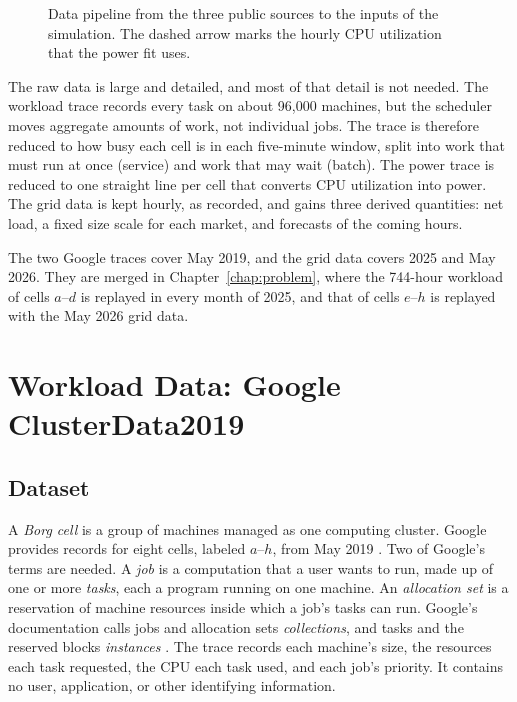 \documentclass{UNCC-thesis}
\begin{document}
\begin{figure}[tbp]
  \caption[Data pipeline from the three public sources]{Data pipeline from the three public sources to the inputs of the
  simulation. The dashed arrow marks the hourly CPU utilization that the power
  fit uses.}
  \label{fig:data-pipeline}
\end{figure}

The raw data is large and detailed, and most of that detail is not needed.
The workload trace records every task on about 96,000 machines, but the
scheduler moves aggregate amounts of work, not individual jobs. The trace is
therefore reduced to how busy each cell is in each five-minute window, split
into work that must run at once (service) and work that may wait (batch).
The power trace is reduced to one straight line per cell that converts CPU
utilization into power. The grid data is kept hourly, as recorded, and gains
three derived quantities: net load, a fixed size scale for each market, and
forecasts of the coming hours.

The two Google traces cover May 2019, and the grid data covers 2025 and May
2026. They are merged in Chapter~\ref{chap:problem}, where the
744-hour workload of cells \(a\)--\(d\) is replayed in every month of 2025,
and that of cells \(e\)--\(h\) is replayed with the May 2026 grid data.

\section{Workload Data: Google ClusterData2019}
\label{sec:clusterdata2019}

\subsection{Dataset}
\label{subsec:clusterdata-role}

A \emph{Borg cell} is a group of machines managed as one computing cluster.
Google provides records for eight cells, labeled \(a\)--\(h\), from May 2019
\cite{wilkes2020clusterdata2019, tirmazi2020borg}. Two of Google's terms are
needed. A \emph{job} is a computation that a user wants to run, made up of one
or more \emph{tasks}, each a program running on one machine. An
\emph{allocation set} is a reservation of machine resources inside which a
job's tasks can run. Google's documentation calls jobs and allocation sets
\emph{collections}, and tasks and the reserved blocks \emph{instances}
\cite{wilkes2020clusterdata2019}. The trace records each machine's size, the
resources each task requested, the CPU each task used, and each job's
priority. It contains no user, application, or other identifying
information.
\end{document}
